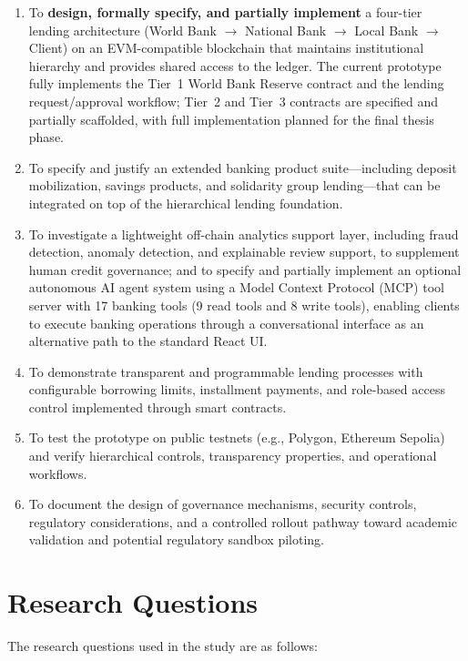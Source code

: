 \documentclass[12pt,a4paper]{report}
\begin{document}
\begin{enumerate}[noitemsep]
\item To \textbf{design, formally specify, and partially implement} a four-tier lending architecture (World Bank $\to$ National Bank $\to$ Local Bank $\to$ Client) on an EVM-compatible blockchain that maintains institutional hierarchy and provides shared access to the ledger. The current prototype fully implements the Tier~1 World Bank Reserve contract and the lending request/approval workflow; Tier~2 and Tier~3 contracts are specified and partially scaffolded, with full implementation planned for the final thesis phase.
\item To specify and justify an extended banking product suite---including deposit mobilization, savings products, and solidarity group lending---that can be integrated on top of the hierarchical lending foundation.
\item To investigate a lightweight off-chain analytics support layer, including fraud detection, anomaly detection, and explainable review support, to supplement human credit governance; and to specify and partially implement an optional autonomous AI agent system using a Model Context Protocol (MCP) tool server with 17 banking tools (9 read tools and 8 write tools), enabling clients to execute banking operations through a conversational interface as an alternative path to the standard React UI.
\item To demonstrate transparent and programmable lending processes with configurable borrowing limits, installment payments, and role-based access control implemented through smart contracts.
\item To test the prototype on public testnets (e.g., Polygon, Ethereum Sepolia) and verify hierarchical controls, transparency properties, and operational workflows.
\item To document the design of governance mechanisms, security controls, regulatory considerations, and a controlled rollout pathway toward academic validation and potential regulatory sandbox piloting.
\end{enumerate}

\section{Research Questions}

The research questions used in the study are as follows:
\end{document}
